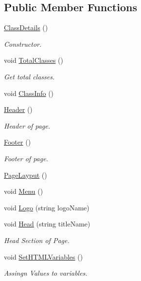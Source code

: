 \subsection*{Public Member Functions}
\begin{DoxyCompactItemize}
\item 
\hyperlink{classClassDetails_af8fb7a92c63d62a03a60c47476f4523a}{Class\-Details} ()
\begin{DoxyCompactList}\small\item\em Constructor. \end{DoxyCompactList}\item 
void \hyperlink{classClassDetails_a2a63d68979d3ac96d35e6534414799ef}{Total\-Classes} ()
\begin{DoxyCompactList}\small\item\em Get total classes. \end{DoxyCompactList}\item 
void \hyperlink{classClassDetails_a7eed324cd736c68fe4b420de481e3b17}{Class\-Info} ()
\item 
\hyperlink{classClassDetails_a4a0b14f8c5ca7f845d64854a0d81e1ec}{Header} ()
\begin{DoxyCompactList}\small\item\em Header of page. \end{DoxyCompactList}\item 
\hyperlink{classClassDetails_a8e80a53e9b6597171c6d8b1976dc33f9}{Footer} ()
\begin{DoxyCompactList}\small\item\em Footer of page. \end{DoxyCompactList}\item 
\hyperlink{classPageLayout_af085725aaa6c01595565797c9f205173}{Page\-Layput} ()
\item 
void \hyperlink{classPageLayout_a49af1dca286bbee9432192a7b3c00332}{Menu} ()
\item 
void \hyperlink{classPageLayout_ae60235c6af48e3ebbc6343d02456da0c}{Logo} (string logo\-Name)
\item 
void \hyperlink{classPageLayout_ae50907d56f0ba7a85f7ccfdeafa45bcc}{Head} (string title\-Name)
\begin{DoxyCompactList}\small\item\em Head Section of Page. \end{DoxyCompactList}\item 
void \hyperlink{classHTMLTags_abe32ec84b6b2940afbc993be2db178e9}{Set\-H\-T\-M\-L\-Variables} ()
\begin{DoxyCompactList}\small\item\em Assingn Values to variables. \end{DoxyCompactList}\item 

\end{DoxyCompactItemize}
